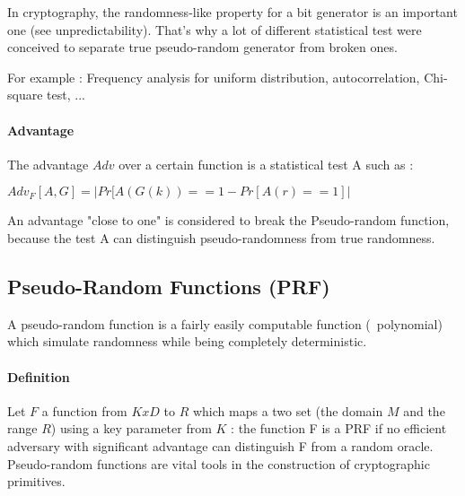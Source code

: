In cryptography, the randomness-like property for a bit generator is an important one (see unpredictability). That's why a lot of different statistical test were conceived to separate true pseudo-random generator from broken ones.

For example : Frequency analysis for uniform distribution, autocorrelation, Chi-square test, ...

\paragraph{Advantage \\}

The advantage $Adv$ over a certain function is a statistical test A such as : 
\begin{mydef}
$Adv_{F} [A,G] = | Pr[A(G(k)) == 1  - Pr[A(r) == 1] | $
\end{mydef}

                     
An advantage "close to one" is considered to break the Pseudo-random function, because the test A can distinguish pseudo-randomness from true randomness.






\subsection{Pseudo-Random Functions     (PRF)}

A pseudo-random function is a fairly easily computable function (~polynomial) which simulate randomness while being completely deterministic.

\paragraph{Definition \\}
Let $F$ a function from $KxD$ to $R$ which maps a two set (the domain $M$ and the range $R$) using a key parameter from $K$ : the function F is a PRF if no efficient adversary with significant advantage can distinguish F from a random oracle. Pseudo-random functions are vital tools in the construction of cryptographic primitives.

